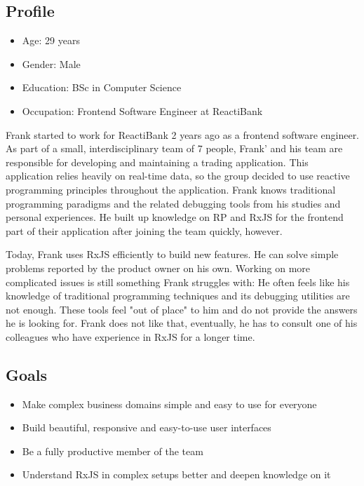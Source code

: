\documentclass[sigplan,screen,nonacm,review]{acmart}
\begin{document}
\subsection{Profile}
\begin{itemize}
	\item Age: 29 years
	\item Gender: Male
	\item Education: BSc in Computer Science
	\item Occupation: Frontend Software Engineer at ReactiBank
\end{itemize}

Frank started to work for ReactiBank 2 years ago as a frontend software engineer. As part of a small, interdisciplinary team of 7 people, Frank' and his team are responsible for developing and maintaining a trading application. This application relies heavily on real-time data, so the group decided to use reactive programming principles throughout the application. Frank knows traditional programming paradigms and the related debugging tools from his studies and personal experiences. He built up knowledge on RP and RxJS for the frontend part of their application after joining the team quickly, however.

Today, Frank uses RxJS efficiently to build new features. He can solve simple problems reported by the product owner on his own. Working on more complicated issues is still something Frank struggles with: He often feels like his knowledge of traditional programming techniques and its debugging utilities are not enough. These tools feel "out of place" to him and do not provide the answers he is looking for. Frank does not like that, eventually, he has to consult one of his colleagues who have experience in RxJS for a longer time.

\subsection{Goals}
\begin{itemize}
	\item Make complex business domains simple and easy to use for everyone
	\item Build beautiful, responsive and easy-to-use user interfaces
	\item Be a fully productive member of the team
	\item Understand RxJS in complex setups better and deepen knowledge on it
\end{itemize}
\end{document}
